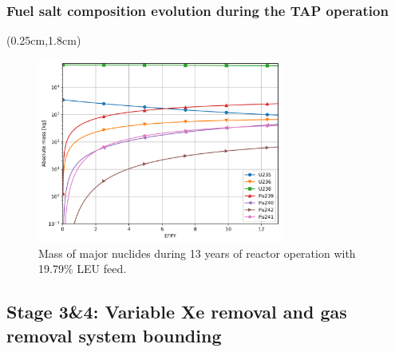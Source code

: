 \begin{frame}
\frametitle{Fuel salt composition evolution during the TAP operation}
\begin{textblock*}{12.25cm}(0.25cm,1.8cm) %
	\begin{figure}[htp!] %
		\centering
				\vspace{-3mm}
		\includegraphics[width=0.72\textwidth]{../figures/u_pu_mass.png}
		\caption{Mass of major nuclides during 13 years of reactor operation 
		with 19.79\% \gls{LEU} feed.}
	\end{figure}
\end{textblock*}
\end{frame}



\subsection{Stage 3\&4: Variable Xe removal and gas removal system bounding}


